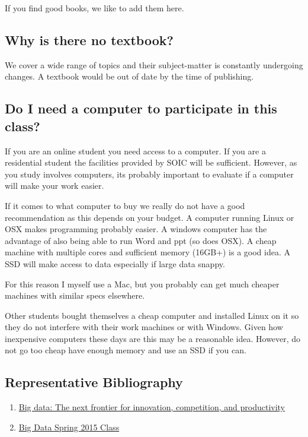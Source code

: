 If you find good books, we like to add them here.


\subsection{Why is there no textbook?}
\label{\detokenize{faq:why-is-there-no-textbook}}
We cover a wide range of topics and their subject-matter is constantly
undergoing changes. A textbook would be out of date by the time of
publishing.


\subsection{Do I need a computer to participate in this class?}
\label{\detokenize{faq:do-i-need-a-computer-to-participate-in-this-class}}
If you are an online student you need access to a computer. If you
are a residential student the facilities provided by SOIC will be
sufficient. However, as you study involves computers, its probably
important to evaluate if a computer will make your work easier.

If it comes to what computer to buy we really do not have a good
recommendation as this depends on your budget. A computer running
Linux or OSX makes programming probably easier. A windows computer has
the advantage of also being able to run Word and ppt (so does OSX). A
cheap machine with multiple cores and sufficient memory (16GB+) is a
good idea. A SSD will make access to data especially if large data
snappy.

For this reason I myself use a Mac, but you probably can get much
cheaper machines with similar specs elsewhere.

Other students bought themselves a cheap computer and installed Linux
on it so they do not interfere with their work machines or with
Windows. Given how inexpensive computers these days are this may be a
reasonable idea. However, do not go too cheap have enough memory and
use an SSD if you can.


\subsection{Representative Bibliography}
\label{\detokenize{faq:representative-bibliography}}\begin{enumerate}
\item {} 
\href{http://www.mckinsey.com/insights/business\_technology/big\_data\_the\_next\_frontier\_for\_innovation}{Big data: The next frontier for innovation, competition, and
productivity}

\item {} 
\href{https://bigdatacoursespring2015.appspot.com}{Big Data Spring 2015
Class}

\end{enumerate}



